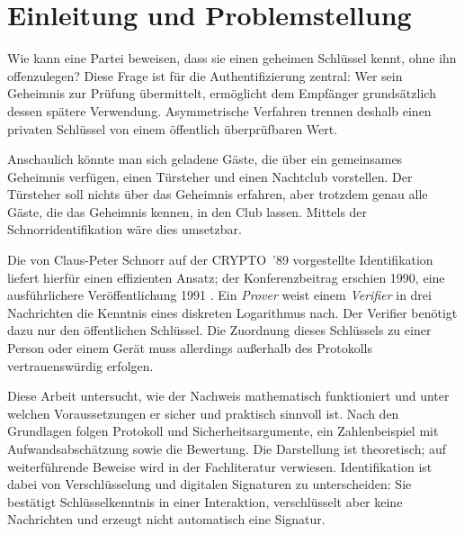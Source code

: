 \section{Einleitung und Problemstellung}\label{sec:einleitung}
Wie kann eine Partei beweisen, dass sie einen geheimen Schlüssel kennt, ohne ihn offenzulegen? Diese Frage ist für die Authentifizierung zentral: Wer sein Geheimnis zur Prüfung übermittelt, ermöglicht dem Empfänger grundsätzlich dessen spätere Verwendung. Asymmetrische Verfahren trennen deshalb einen privaten Schlüssel von einem öffentlich überprüfbaren Wert.

Anschaulich könnte man sich geladene Gäste, die über ein gemeinsames Geheimnis verfügen, einen Türsteher und einen Nachtclub vorstellen. 
Der Türsteher soll nichts über das Geheimnis erfahren, aber trotzdem genau alle Gäste, die das Geheimnis kennen, in den Club lassen. 
Mittels der Schnorridentifikation wäre dies umsetzbar.

Die von Claus-Peter Schnorr auf der CRYPTO~'89 vorgestellte Identifikation liefert hierfür einen effizienten Ansatz; der Konferenzbeitrag erschien 1990, eine ausführlichere Veröffentlichung 1991 \cite{schnorr1989,schnorr1991}. Ein \emph{Prover} weist einem \emph{Verifier} in drei Nachrichten die Kenntnis eines diskreten Logarithmus nach. Der Verifier benötigt dazu nur den öffentlichen Schlüssel. Die Zuordnung dieses Schlüssels zu einer Person oder einem Gerät muss allerdings außerhalb des Protokolls vertrauenswürdig erfolgen.

Diese Arbeit untersucht, wie der Nachweis mathematisch funktioniert und unter welchen Voraussetzungen er sicher und praktisch sinnvoll ist. Nach den Grundlagen folgen Protokoll und Sicherheitsargumente, ein Zahlenbeispiel mit Aufwandsabschätzung sowie die Bewertung. Die Darstellung ist theoretisch; auf weiterführende Beweise wird in der Fachliteratur verwiesen. Identifikation ist dabei von Verschlüsselung und digitalen Signaturen zu unterscheiden: Sie bestätigt Schlüsselkenntnis in einer Interaktion, verschlüsselt aber keine Nachrichten und erzeugt nicht automatisch eine Signatur.

